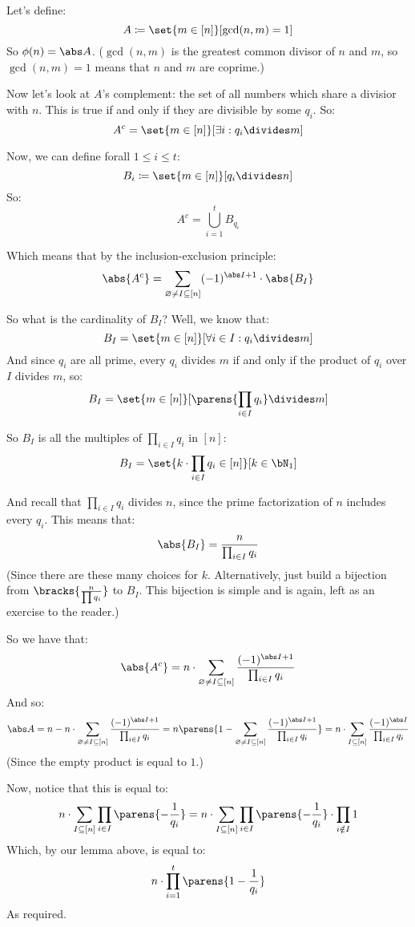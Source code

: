 \begin{blankpp}

	Let's define:
	\[ A\coloneqq\set{m\in[n]}[\gcd(n,m)=1] \]
	So $\phi(n)=\abs A$.
	($\gcd(n,m)$ is the greatest common divisor of $n$ and $m$, so $\gcd(n,m)=1$ means that $n$ and $m$ are coprime.)

	Now let's look at $A$'s complement: the set of all numbers which share a divisior with $n$.
	This is true if and only if they are divisible by some $q_i$.
	So:
	\[ A^c=\set{m\in[n]}[\exists i: q_i\divides m] \]

	Now, we can define forall $1\leq i\leq t$:
	\[ B_i\coloneqq\set{m\in [n]}[q_i\divides n] \]
	So:
	\[ A^c=\bigcup_{i=1}^t B_{q_i} \]

	Which means that by the inclusion-exclusion principle:
	\[ \abs{A^c} = \sum_{\varnothing\neq I\subseteq[n]}(-1)^{\abs I+1}\cdot\abs{B_I} \]

	So what is the cardinality of $B_I$?
	Well, we know that:
	\[ B_I=\set{m\in [n]}[\forall i\in I:q_i\divides m] \]
	And since $q_i$ are all prime, every $q_i$ divides $m$ if and only if the product of $q_i$ over $I$ divides $m$, so:
	\[ B_I=\set{m\in [n]}[\parens{\prod_{i\in I}q_i} \divides m] \]

	So $B_I$ is all the multiples of $\prod\limits_{i\in I}q_i$ in $[n]$:
	\[ B_I = \set{k\cdot\prod_{i\in I}q_i\in[n]}[k\in\bN_1] \]

	And recall that $\prod\limits_{i\in I}q_i$ divides $n$, since the prime factorization of $n$ includes every $q_i$.
	This means that:
	\[ \abs{B_I} = \frac{n}{\prod_{i\in I}q_i} \]
	(Since there are these many choices for $k$.
	Alternatively, just build a bijection from $\bracks{\frac{n}{\prod q_i}}$ to $B_I$.
	This bijection is simple and is again, left as an exercise to the reader.)

	So we have that:
	\[ \abs{A^c} = n\cdot\sum_{\varnothing\neq I\subseteq[n]}\dfrac{(-1)^{\abs I+1}}{\prod_{i\in I}q_i} \]
	And so:
	\[ \abs A = n - n\cdot\sum_{\varnothing\neq I\subseteq[n]}\dfrac{(-1)^{\abs I+1}}{\prod_{i\in I}q_i} 
	= n\parens{1-\sum_{\varnothing\neq I\subseteq[n]}\dfrac{(-1)^{\abs I+1}}{\prod_{i\in I}q_i}}
	= n\cdot\sum_{I\subseteq[n]}\dfrac{(-1)^{\abs I}}{\prod_{i\in I}q_i} \]
	(Since the empty product is equal to $1$.)

	Now, notice that this is equal to:
	\[ n\cdot\sum_{I\subseteq[n]}\prod_{i\in I}\parens{-\frac1{q_i}} =
	n\cdot\sum_{I\subseteq[n]}\prod_{i\in I}\parens{-\frac1{q_i}}\cdot\prod_{i\notin I}1 \]
	Which, by our lemma above, is equal to:
	\[ n\cdot\prod_{i=1}^t\parens{1-\frac1{q_i}} \]
	As required.

\end{blankpp}

